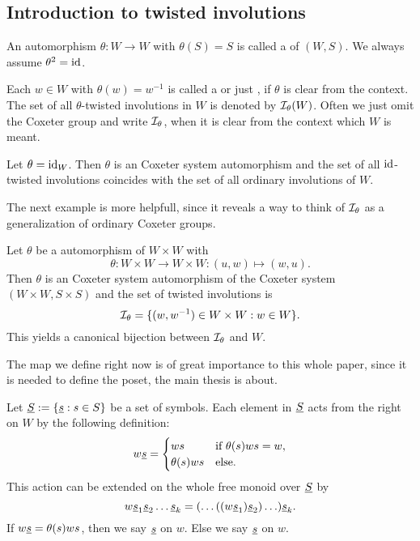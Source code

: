 \subsection{Introduction to twisted involutions}
\label{sec:twisted-involutions-introduction}

\begin{defi}
	An automorphism $\theta : W \to W$ with $\theta(S) = S$ is called a  of $(W,S)$. We always assume $\theta^2 = \operatorname{id}$.
\end{defi}

\begin{defi}
	Each $w \in W$ with $\theta(w) = w^{-1}$ is called a  or just , if $\theta$ is clear from the context. The set of all $\theta$-twisted involutions in $W$ is denoted by $\mathcal{I}_{\theta}(W)$. Often we just omit the Coxeter group and write $\mathcal{I}_{\theta}$, when it is clear from the context which $W$ is meant.
\end{defi}

\begin{exam}
	Let $\theta = \operatorname{id}_W$. Then $\theta$ is an Coxeter system automorphism and the set of all $\operatorname{id}$-twisted involutions coincides with the set of all ordinary involutions of $W$.
\end{exam}

The next example is more helpfull, since it reveals a way to think of $\mathcal{I}_{\theta}$ as a generalization of ordinary Coxeter groups.

\begin{exam}
	Let $\theta$ be a automorphism of $W \times W$ with
	$$ \theta : W \times W \to W \times W : (u,w) \mapsto (w,u). $$
	Then $\theta$ is an Coxeter system automorphism of the Coxeter system $(W \times W, S \times S)$ and the set of twisted involutions is
	$$ \mathcal{I}_{\theta} = \{ (w,w^{-1}) \in W \times W : w \in W \}. $$
	This yields a canonical bijection between $\mathcal{I}_{\theta}$ and $W$.
\end{exam}

The map we define right now is of great importance to this whole paper, since it is needed to define the poset, the main thesis is about.

\begin{defi}
	Let $\underline{S} := \{ \underline{s} : s \in S \}$ be a set of symbols. Each element in $\underline{S}$ acts from the right on $W$ by the following definition:
	$$ w \underline{s} = \begin{cases}
		ws & \textrm{if } \theta(s)ws = w, \\
		\theta(s)ws & \textrm{else}. \\
	\end{cases} $$
	This action can be extended on the whole free monoid over $\underline{S}$ by
	$$ w \underline{s}_1 \underline{s}_2 \ldots \underline{s}_k = (\ldots ((w \underline{s}_1) \underline{s}_2) \ldots) \underline{s}_k. $$
	If $w \underline{s} = \theta(s)ws$, then we say $\underline{s}$  on $w$. Else we say $\underline{s}$  on $w$.
\end{defi}

